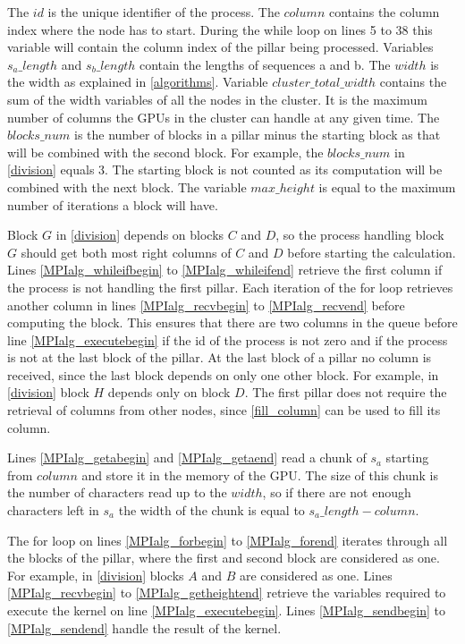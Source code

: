 The $id$ is the unique identifier of the process.
The $column$ contains the column index where the node has to start. During the while loop on lines 5 to 38 this variable will contain the column index of the pillar being processed.
Variables $s_a\_length$ and $s_b\_length$ contain the lengths of sequences a and b.
The $width$ is the width as explained in \cref{algorithms}.
Variable $cluster\_total\_width$ contains the sum of the width variables of all the nodes in the cluster.
It is the maximum number of columns the GPUs in the cluster can handle at any given time.
The $blocks\_num$ is the number of blocks in a pillar minus the starting block as that will be combined with the second block.
For example, the $blocks\_num$ in \cref{division} equals $3$.
The starting block is not counted as its computation will be combined with the next block.
The variable $max\_height$ is equal to the maximum number of iterations a block will have.

Block $G$ in \cref{division} depends on blocks $C$ and $D$, so the process handling block $G$ should get both most right columns of $C$ and $D$ before starting the calculation.
Lines \ref{MPIalg_whileifbegin} to \ref{MPIalg_whileifend} retrieve the first column if the process is not handling the first pillar.
Each iteration of the for loop retrieves another column in lines \ref{MPIalg_recvbegin} to \ref{MPIalg_recvend} before computing the block.
This ensures that there are two columns in the queue before line \ref{MPIalg_executebegin} if the id of the process is not zero and if the process is not at the last block of the pillar.
At the last block of a pillar no column is received, since the last block depends on only one other block.
For example, in \cref{division} block $H$ depends only on block $D$.
The first pillar does not require the retrieval of columns from other nodes, since \cref{fill_column} can be used to fill its column.

Lines \ref{MPIalg_getabegin} and \ref{MPIalg_getaend} read a chunk of $s_a$ starting from $column$ and store it in the memory of the GPU.
The size of this chunk is the number of characters read up to the $width$, so if there are not enough characters left in $s_a$ the width of the chunk is equal to $s_a\_length - column$.

The for loop on lines \ref{MPIalg_forbegin} to \ref{MPIalg_forend} iterates through all the blocks of the pillar, where the first and second block are considered as one.
For example, in \cref{division} blocks $A$ and $B$ are considered as one.
Lines \ref{MPIalg_recvbegin} to \ref{MPIalg_getheightend} retrieve the variables required to execute the kernel on line \ref{MPIalg_executebegin}.
Lines \ref{MPIalg_sendbegin} to \ref{MPIalg_sendend} handle the result of the kernel.

